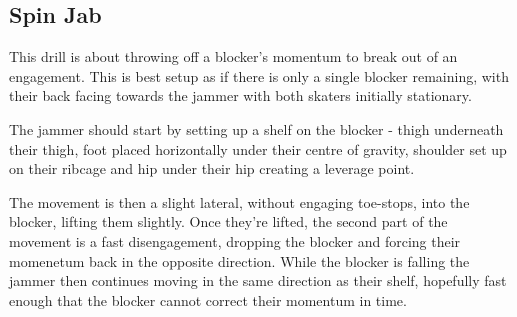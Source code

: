 \subsection*{Spin Jab}
\label{drill:last_blocker/drop_shelf}

This drill is about throwing off a blocker's momentum to break out of an engagement.
This is best setup as if there is only a single blocker remaining, with their back facing towards the jammer with both skaters initially stationary.  

The jammer should start by setting up a shelf on the blocker - thigh underneath their thigh, foot placed horizontally under their centre of gravity, shoulder set up on their ribcage and hip under their hip creating a leverage point.  

The movement is then a slight lateral, without engaging toe-stops, into the blocker, lifting them slightly.
Once they're lifted, the second part of the movement is a fast disengagement, dropping the blocker and forcing their momenetum back in the opposite direction.  
While the blocker is falling the jammer then continues moving in the same direction as their shelf, hopefully fast enough that the blocker cannot correct their momentum in time. 



